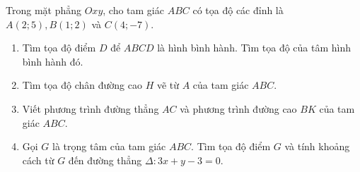 \begin{bt}%
 Trong mặt phẳng $ Oxy $, cho tam giác $ ABC $ có tọa độ các đỉnh là $ A(2;5),B(1;2) $ và $ C(4;-7) $.

 \begin{enumerate}
     \item Tìm tọa độ điểm $ D $ để $ ABCD $ là hình bình hành. Tìm tọa độ của tâm hình bình hành đó.
     \item Tìm tọa độ chân đường cao $ H $ vẽ từ $ A $ của tam giác $ ABC $.
     \item Viết phương trình đường thẳng $ AC $ và phương trình đường cao $ BK $ của tam giác $ ABC$.
     \item Gọi $ G $ là trọng tâm của tam giác $ ABC $. Tìm tọa độ điểm $ G $ và tính khoảng cách từ $ G $ đến đường thẳng $ \Delta\colon 3x+y-3=0 $.
 \end{enumerate}
\end{bt}
